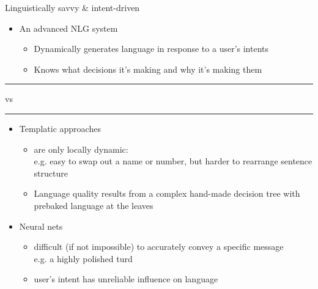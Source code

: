 \documentclass[10pt, compress]{beamer}
\begin{document}
\begin{frame}{Linguistically savvy \& intent-driven}
    \begin{itemize}
    	\item An advanced NLG system
            \begin{itemize}
                \item Dynamically generates language in response to a user's intents\\
                \item Knows what decisions it's making and why it's making them\\
            \end{itemize}
    \end{itemize}
    \pause
    \begin{center}
        \rule{50pt}{0.4pt} vs \rule{50pt}{0.4pt}
     \end{center}
	\begin{itemize}
		\item Templatic approaches
		\begin{itemize}
			\item are only locally dynamic:\\
				e.g. easy to swap out a name or number, but harder to rearrange sentence structure
			\item Language quality results from a complex hand-made decision tree with prebaked language at the leaves
		\end{itemize}

		\item Neural nets
		\begin{itemize}
			\item difficult (if not impossible) to accurately convey a specific message\\
				e.g. a highly polished turd
			\item user's intent has unreliable influence on language
		\end{itemize}
	\end{itemize}
\end{frame}
\end{document}
